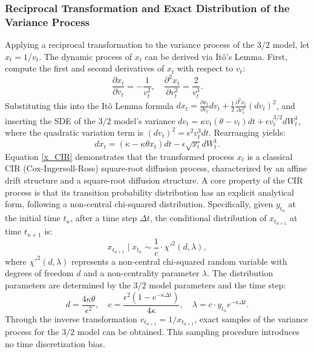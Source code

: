\subsubsection{Reciprocal Transformation and Exact Distribution of the Variance Process}
Applying a reciprocal transformation to the variance process of the $3/2$ model, let $x_t = 1/v_t$. The dynamic process of $x_t$ can be derived via Itô's Lemma. First, compute the first and second derivatives of $x_t$ with respect to $v_t$:
\begin{equation}
  \frac{\partial x_t}{\partial v_t} = -\frac{1}{v_t^2}, \quad \frac{\partial^2 x_t}{\partial v_t^2} = \frac{2}{v_t^3}.
\end{equation}
Substituting this into the Itô Lemma formula $dx_t = \frac{\partial x_t}{\partial v_t} dv_t + \frac{1}{2}\frac{\partial^2 x_t}{\partial v_t^2}(dv_t)^2$, and inserting the SDE of the $3/2$ model's variance $dv_t = \kappa v_t(\theta - v_t)dt + \epsilon v_t^{3/2}dW_t^1$, where the quadratic variation term is $(dv_t)^2 = \epsilon^2 v_t^3 dt$. Rearranging yields:
\begin{equation}
  dx_t = \left(\kappa - \kappa \theta x_t\right)dt - \epsilon \sqrt{x_t} dW_t^1.
  \label{x_CIR}
\end{equation}
Equation \eqref{x_CIR} demonstrates that the transformed process $x_t$ is a classical CIR (Cox-Ingersoll-Ross) square-root diffusion process, characterized by an affine drift structure and a square-root diffusion structure. A core property of the CIR process is that its transition probability distribution has an explicit analytical form, following a non-central chi-squared distribution.
Specifically, given $y_{t_n}$ at the initial time $t_n$, after a time step $\Delta t$, the conditional distribution of $x_{t_{n+1}}$ at time $t_{n+1}$ is:
\begin{equation}
  x_{t_{n+1}} \mid x_{t_n} \sim \frac{1}{c} \cdot \chi'^2\left(d, \lambda\right),
  \label{x_distribution}
\end{equation}
where $\chi'^2(d,\lambda)$ represents a non-central chi-squared random variable with degrees of freedom $d$ and a non-centrality parameter $\lambda$. The distribution parameters are determined by the $3/2$ model parameters and the time step:
\begin{equation}
d = \frac{4\kappa\theta}{\epsilon^2}, \quad c = \frac{\epsilon^2\left(1 - e^{-\kappa\Delta t}\right)}{4\kappa}, \quad \lambda = c \cdot y_{t_n} e^{-\kappa\Delta t}.
\end{equation}
Through the inverse transformation $v_{t_{n+1}} = 1/x_{t_{n+1}}$, exact samples of the variance process for the $3/2$ model can be obtained. This sampling procedure introduces no time discretization bias.


